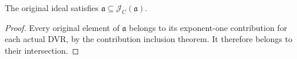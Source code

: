 \begin{theorem}\label{thm:sc0-original-ideal-multiplier-ideal}
\leanok
{}
The original ideal satisfies $\mathfrak a\subseteq\mathcal J_C(\mathfrak a)$.
\end{theorem}
\begin{proof}
Every original element of $\mathfrak a$ belongs to its exponent-one
contribution for each actual DVR, by the contribution inclusion theorem.
It therefore belongs to their intersection.
\end{proof}
